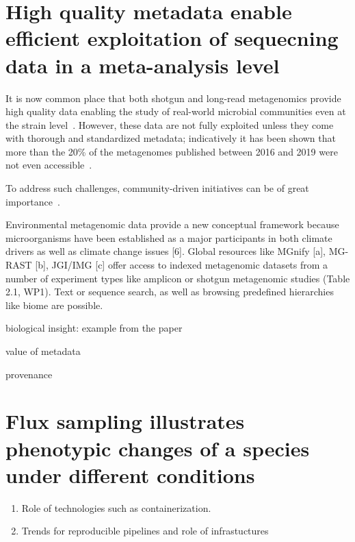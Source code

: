 \section{High quality metadata enable efficient exploitation of sequecning data in a meta-analysis level}
\label{chap:concl-associations}
   
      It is now common place that both shotgun and long-read metagenomics provide 
      high quality data enabling the study of real-world microbial communities even at the strain level~\citep{meyer2022critical}.
      However, these data are not fully exploited unless they come with thorough and standardized metadata;
      indicatively it has been shown that more than the 20\% of the metagenomes published between 2016 and 2019 
      were not even accessible~\citep{eckert2020every}.
      
      To address such challenges, community-driven initiatives can be of great importance~\citep{vangay2021microbiome}.
   
   
      Environmental metagenomic data provide a new conceptual framework because microorganisms have been established as a major participants 
      in both climate drivers as well as climate change issues [6]. 
      Global resources like MGnify [a], MG-RAST [b], JGI/IMG [c] offer access to indexed metagenomic datasets from a number of experiment types 
      like amplicon or shotgun metagenomic studies (Table 2.1, WP1). 
      Text or sequence search, as well as browsing predefined hierarchies like biome are possible. 
      
   
   
      biological insight: example from the paper 
   
   
      value of metadata 
   
      provenance 



\section{Flux sampling illustrates phenotypic changes of a species under different conditions}
\label{chap:concl-met-nets}



   \begin{enumerate}
      \item Role of technologies such as containerization. 
      \item Trends for reproducible pipelines and role of infrastuctures
   \end{enumerate}


